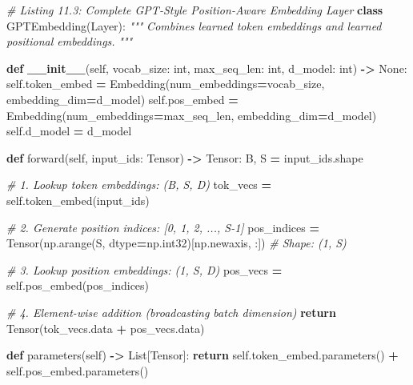 \documentclass[
  letterpaper,
]{scrbook}
\newenvironment{Shaded}{\begin{snugshade}}{\end{snugshade}}
\newcommand{\BuiltInTok}[1]{#1}
\newcommand{\CommentTok}[1]{\textcolor[rgb]{0.56,0.35,0.01}{\textit{#1}}}
\newcommand{\ControlFlowTok}[1]{\textcolor[rgb]{0.13,0.29,0.53}{\textbf{#1}}}
\newcommand{\FunctionTok}[1]{\textcolor[rgb]{0.13,0.29,0.53}{\textbf{#1}}}
\newcommand{\KeywordTok}[1]{\textcolor[rgb]{0.13,0.29,0.53}{\textbf{#1}}}
\newcommand{\NormalTok}[1]{#1}
\newcommand{\OperatorTok}[1]{\textcolor[rgb]{0.81,0.36,0.00}{\textbf{#1}}}
\newcommand{\VariableTok}[1]{\textcolor[rgb]{0.00,0.00,0.00}{#1}}
\begin{document}
\begin{Shaded}
\begin{Highlighting}[]
\CommentTok{\# Listing 11.3: Complete GPT{-}Style Position{-}Aware Embedding Layer}
\KeywordTok{class}\NormalTok{ GPTEmbedding(Layer):}
    \CommentTok{"""}
\CommentTok{    Combines learned token embeddings and learned positional embeddings.}
\CommentTok{    """}

    \KeywordTok{def} \FunctionTok{\_\_init\_\_}\NormalTok{(}\VariableTok{self}\NormalTok{, vocab\_size: }\BuiltInTok{int}\NormalTok{, max\_seq\_len: }\BuiltInTok{int}\NormalTok{, d\_model: }\BuiltInTok{int}\NormalTok{) }\OperatorTok{{-}\textgreater{}} \VariableTok{None}\NormalTok{:}
        \VariableTok{self}\NormalTok{.token\_embed }\OperatorTok{=}\NormalTok{ Embedding(num\_embeddings}\OperatorTok{=}\NormalTok{vocab\_size, embedding\_dim}\OperatorTok{=}\NormalTok{d\_model)}
        \VariableTok{self}\NormalTok{.pos\_embed }\OperatorTok{=}\NormalTok{ Embedding(num\_embeddings}\OperatorTok{=}\NormalTok{max\_seq\_len, embedding\_dim}\OperatorTok{=}\NormalTok{d\_model)}
        \VariableTok{self}\NormalTok{.d\_model }\OperatorTok{=}\NormalTok{ d\_model}

    \KeywordTok{def}\NormalTok{ forward(}\VariableTok{self}\NormalTok{, input\_ids: Tensor) }\OperatorTok{{-}\textgreater{}}\NormalTok{ Tensor:}
\NormalTok{        B, S }\OperatorTok{=}\NormalTok{ input\_ids.shape}

        \CommentTok{\# 1. Lookup token embeddings: (B, S, D)}
\NormalTok{        tok\_vecs }\OperatorTok{=} \VariableTok{self}\NormalTok{.token\_embed(input\_ids)}

        \CommentTok{\# 2. Generate position indices: [0, 1, 2, ..., S{-}1]}
\NormalTok{        pos\_indices }\OperatorTok{=}\NormalTok{ Tensor(np.arange(S, dtype}\OperatorTok{=}\NormalTok{np.int32)[np.newaxis, :])  }\CommentTok{\# Shape: (1, S)}

        \CommentTok{\# 3. Lookup position embeddings: (1, S, D)}
\NormalTok{        pos\_vecs }\OperatorTok{=} \VariableTok{self}\NormalTok{.pos\_embed(pos\_indices)}

        \CommentTok{\# 4. Element{-}wise addition (broadcasting batch dimension)}
        \ControlFlowTok{return}\NormalTok{ Tensor(tok\_vecs.data }\OperatorTok{+}\NormalTok{ pos\_vecs.data)}

    \KeywordTok{def}\NormalTok{ parameters(}\VariableTok{self}\NormalTok{) }\OperatorTok{{-}\textgreater{}}\NormalTok{ List[Tensor]:}
        \ControlFlowTok{return} \VariableTok{self}\NormalTok{.token\_embed.parameters() }\OperatorTok{+} \VariableTok{self}\NormalTok{.pos\_embed.parameters()}
\end{Highlighting}
\end{Shaded}
\end{document}
